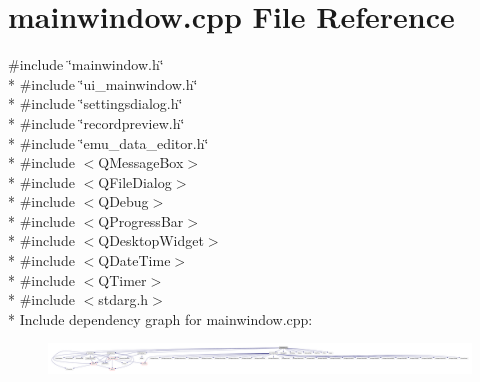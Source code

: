 \hypertarget{a00038}{\section{mainwindow.\+cpp File Reference}
\label{a00038}
}
{\ttfamily \#include \char`\"{}mainwindow.\+h\char`\"{}}\\*
{\ttfamily \#include \char`\"{}ui\+\_\+mainwindow.\+h\char`\"{}}\\*
{\ttfamily \#include \char`\"{}settingsdialog.\+h\char`\"{}}\\*
{\ttfamily \#include \char`\"{}recordpreview.\+h\char`\"{}}\\*
{\ttfamily \#include \char`\"{}emu\+\_\+data\+\_\+editor.\+h\char`\"{}}\\*
{\ttfamily \#include $<$Q\+Message\+Box$>$}\\*
{\ttfamily \#include $<$Q\+File\+Dialog$>$}\\*
{\ttfamily \#include $<$Q\+Debug$>$}\\*
{\ttfamily \#include $<$Q\+Progress\+Bar$>$}\\*
{\ttfamily \#include $<$Q\+Desktop\+Widget$>$}\\*
{\ttfamily \#include $<$Q\+Date\+Time$>$}\\*
{\ttfamily \#include $<$Q\+Timer$>$}\\*
{\ttfamily \#include $<$stdarg.\+h$>$}\\*
Include dependency graph for mainwindow.\+cpp\+:
\nopagebreak
\begin{figure}[H]
\begin{center}
\leavevmode
\includegraphics[width=350pt]{d2/d34/a00156}
\end{center}
\end{figure}

